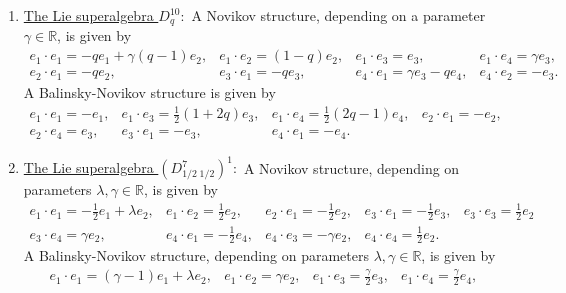 \documentclass[12pt]{amsart}
\begin{document}
\begin{enumerate}
\[\begin{array}{llll}
    e_1\cdot e_1= \gamma e_1, &  e_1\cdot e_2=(1+\gamma)e_2, &  e_1\cdot e_3=(p+\gamma)  e_3-q e_4, & e_1\cdot e_4=q e_3+ (p+\gamma) e_4, \\[2mm]
    e_2\cdot e_1=\gamma e_2, &  e_3\cdot e_1=\gamma e_3, &  e_4\cdot e_1=\gamma e_4.
    \end{array}
    \]
    A Balinsky-Novikov structure, depending on a parameter $\gamma \in \mathbb R$, is given by
\[
\begin{array}{lllll}
e_1 \cdot e_1= \gamma e_2, & e_1 \cdot e_2=e_2, & e_1 \cdot e_3=p e_3 -q e_4,&  
e_1 \cdot e_4= q e_3 + p e_4.
\end{array}
\]
\item \underline{The Lie superalgebra $D^{10}_{q}:$} A Novikov structure, depending on a parameter $\gamma \in \mathbb R$, is given by
\[
\begin{array}{llll}
e_1\cdot e_1=-q e_1 +\gamma(q-1)e_2, &  e_1\cdot e_2=(1-q)e_2, & e_1\cdot e_3=e_3, & e_1\cdot e_4=\gamma e_3, \\[2mm] e_2\cdot e_1=-q e_2, & e_3\cdot e_1=-q e_3, &  e_4 \cdot e_1=\gamma e_3 -q e_4, & e_4 \cdot e_2=-e_3.
\end{array}
\]
A Balinsky-Novikov structure is given by
\[
\begin{array}{llll}
e_1\cdot e_1= -e_1, & e_1 \cdot e_3= \frac{1}{2}(1+2q)e_3, & e_1 \cdot e_4=\frac{1}{2}(2q-1)e_4, & 
e_2 \cdot e_1= -e_2, \\[2mm] 
e_2 \cdot e_4=e_3, & e_3 \cdot e_1=-e_3, & e_4\cdot e_1=-e_4.
\end{array}
\]
 \item \underline{The Lie superalgebra $(D^{7}_{1/2\; 1/2})^1:$} A Novikov structure, depending on parameters $\lambda, \gamma \in \mathbb R$, is given by
 \[
 \begin{array}{lllll}
e_1\cdot e_1=-\frac{1}{2} e_1 +\lambda e_2, &  e_1\cdot e_2=\frac{1}{2} e_2, &  e_2\cdot e_1= - \frac{1}{2} e_2, & e_3\cdot e_1=- \frac{1}{2} e_3, & e_3\cdot e_3=\frac{1}{2} e_2\\[2mm]
e_3\cdot e_4= \gamma e_2, &  e_4 \cdot e_1=-\frac{1}{2} e_4, &  e_4 \cdot e_3=- \gamma e_2, & e_4\cdot e_4=\frac{1}{2}e_2.
\end{array}
 \]
 A Balinsky-Novikov structure, depending on parameters $\lambda, \gamma \in \mathbb R$, is given by
 \[
 \begin{array}{llll}
e_1 \cdot e_1= (\gamma -1)e_1+\lambda e_2, & e_1\cdot e_2= \gamma e_2, & e_1\cdot e_3=\frac{\gamma}{2}e_3, & e_1\cdot e_4= \frac{\gamma}{2}e_4,\\[2mm]

\end{array}\]
\end{enumerate}
\end{document}
